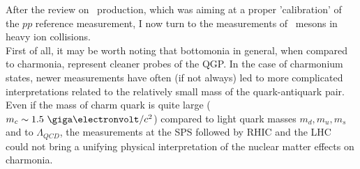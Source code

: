 After the review on \PgU~production, which was aiming at a proper
'calibration' of the $pp$ reference measurement, I now turn to the
measurements of \PgU~mesons in heavy ion collisions.
\\
First of all, it may be worth noting that bottomonia in general, when
compared to charmonia, represent cleaner probes of the QGP. In the case of charmonium states, newer
measurements have often (if not always) led to more complicated
interpretations related to the relatively small mass of the
quark-antiquark pair. Even if the mass of charm quark is quite
large ($m_{c} \sim 1.5~\unitMass$) compared to light quark masses $m_{d},
m_{u}, m_{s}$ and to $\Lambda_{QCD}$, the measurements at the SPS
followed by RHIC and the LHC could not bring a unifying physical
interpretation of the nuclear matter effects on charmonia.







